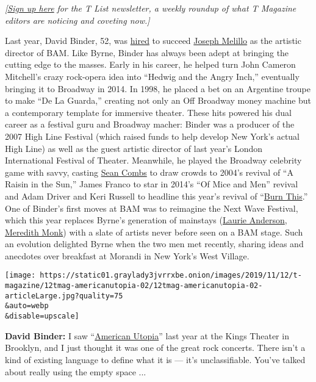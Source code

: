\emph{{[}}\href{https://www.nytimes3xbfgragh.onion/newsletters/t-list?module=inline}{\emph{Sign
up here}} \emph{for the T List newsletter, a weekly roundup of what T
Magazine editors are noticing and coveting now.{]}}

Last year, David Binder, 52, was
\href{https://www.nytimes3xbfgragh.onion/2018/02/07/theater/broadway-producer-named-bams-new-artistic-director.html}{hired}
to succeed
\href{https://www.nytimes3xbfgragh.onion/2018/09/13/theater/next-wave-festival-joseph-melillo-brooklyn-academy-of-music.html}{Joseph
Melillo} as the artistic director of BAM. Like Byrne, Binder has always
been adept at bringing the cutting edge to the masses. Early in his
career, he helped turn John Cameron Mitchell's crazy rock-opera idea
into ``Hedwig and the Angry Inch,'' eventually bringing it to Broadway
in 2014. In 1998, he placed a bet on an Argentine troupe to make ``De La
Guarda,'' creating not only an Off Broadway money machine but a
contemporary template for immersive theater. These hits powered his dual
career as a festival guru and Broadway macher: Binder was a producer of
the 2007 High Line Festival (which raised funds to help develop New
York's actual High Line) as well as the guest artistic director of last
year's London International Festival of Theater. Meanwhile, he played
the Broadway celebrity game with savvy, casting
\href{https://www.nytimes3xbfgragh.onion/topic/person/sean-combs}{Sean
Combs} to draw crowds to 2004's revival of ``A Raisin in the Sun,''
James Franco to star in 2014's ``Of Mice and Men'' revival and Adam
Driver and Keri Russell to headline this year's revival of
``\href{https://www.nytimes3xbfgragh.onion/2019/03/07/theater/adam-driver-keri-russell-burn-this-star-wars.html}{Burn
This}.'' One of Binder's first moves at BAM was to reimagine the Next
Wave Festival, which this year replaces Byrne's generation of mainstays
(\href{https://www.nytimes3xbfgragh.onion/topic/person/laurie-anderson}{Laurie
Anderson},
\href{https://www.nytimes3xbfgragh.onion/2019/06/04/arts/music/atlas-la-philharmonic-meredith-monk.html}{Meredith
Monk}) with a slate of artists never before seen on a BAM stage. Such an
evolution delighted Byrne when the two men met recently, sharing ideas
and anecdotes over breakfast at Morandi in New York's West Village.

\texttt{[image: https://static01.graylady3jvrrxbe.onion/images/2019/11/12/t-magazine/12tmag-americanutopia-02/12tmag-americanutopia-02-articleLarge.jpg?quality=75\\\&auto=webp\\\&disable=upscale]}

\textbf{David Binder:} I saw
``\href{https://americanutopiabroadway.com/}{American Utopia}'' last
year at the Kings Theater in Brooklyn, and I just thought it was one of
the great rock concerts. There isn't a kind of existing language to
define what it is --- it's unclassifiable. You've talked about really
using the empty space ...

